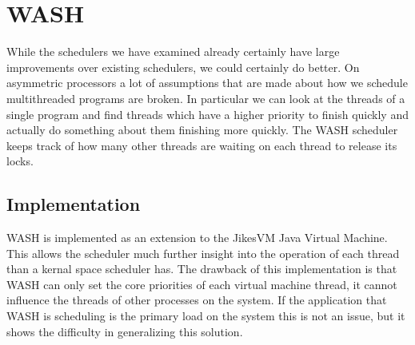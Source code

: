 \section{WASH}
While the schedulers we have examined already certainly have large improvements over existing schedulers, we could certainly do better.
On asymmetric processors a lot of assumptions that are made about how we schedule multithreaded programs are broken.
In particular we can look at the threads of a single program and find threads which have a higher priority to finish quickly and actually do something about them finishing more quickly.
The WASH scheduler keeps track of how many other threads are waiting on each thread to release its locks.

\subsection{Implementation}
WASH is implemented as an extension to the JikesVM Java Virtual Machine.
This allows the scheduler much further insight into the operation of each thread than a kernal space scheduler has.
The drawback of this implementation is that WASH can only set the core priorities of each virtual machine thread, it cannot influence the threads of other processes on the system.
If the application that WASH is scheduling is the primary load on the system this is not an issue, but it shows the difficulty in generalizing this solution.
